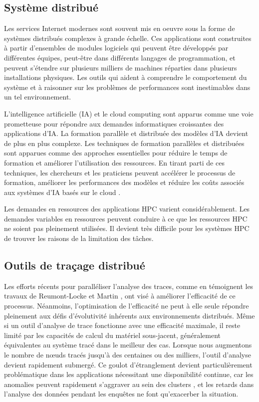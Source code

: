 \subsection{Système distribué}

Les services Internet modernes sont souvent mis en oeuvre sous la forme de systèmes distribués complexes à grande échelle. Ces applications sont construites à partir d'ensembles de modules logiciels qui peuvent être développés par différentes équipes, peut-être dans différents langages de programmation, et peuvent s'étendre sur plusieurs milliers de machines réparties dans plusieurs installations physiques. Les outils qui aident à comprendre le comportement du système et à raisonner sur les problèmes de performances sont inestimables dans un tel environnement.

L'intelligence artificielle (IA) et le cloud computing sont apparus comme une voie prometteuse pour répondre aux demandes informatiques croissantes des applications d'IA. La formation parallèle et distribuée des modèles d'IA devient de plus en plus complexe. Les techniques de formation parallèles et distribuées sont apparues comme des approches essentielles pour réduire le temps de formation et améliorer l'utilisation des ressources. En tirant parti de ces techniques, les chercheurs et les praticiens peuvent accélérer le processus de formation, améliorer les performances des modèles et réduire les coûts associés aux systèmes d'IA basés sur le cloud \cite{mungoli2023scalable}.

Les demandes en ressources des applications HPC varient considérablement. Les demandes variables en ressources peuvent conduire à ce que les ressources HPC ne soient pas pleinement utilisées. Il devient très difficile pour les systèmes HPC de trouver les raisons de la limitation des tâches. \cite{li2023analyzing}

\subsection{Outils de traçage distribué}

Les efforts récents pour paralléliser l'analyse des traces, comme en témoignent les travaux de Reumont-Locke \cite{reumont2015methodes} et Martin \cite{Martin2018}, ont visé à améliorer l'efficacité de ce processus. Néanmoins, l'optimisation de l'efficacité ne peut à elle seule répondre pleinement aux défis d'évolutivité inhérents aux environnements distribués. Même si un outil d'analyse de trace fonctionne avec une efficacité maximale, il reste limité par les capacités de calcul du matériel sous-jacent, généralement équivalentes au système tracé dans le meilleur des cas. Lorsque nous augmentons le nombre de nœuds tracés jusqu'à des centaines ou des milliers, l'outil d'analyse devient rapidement submergé. Ce goulot d'étranglement devient particulièrement problématique dans les applications nécessitant une disponibilité continue, car les anomalies peuvent rapidement s'aggraver au sein des clusters \cite{matloff2011programming}, et les retards dans l'analyse des données pendant les enquêtes ne font qu'exacerber la situation.

